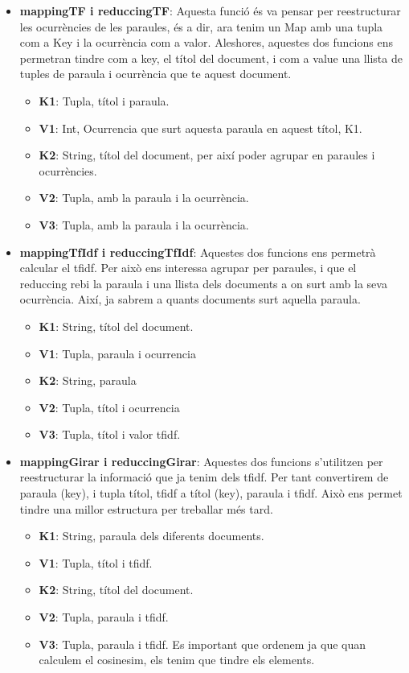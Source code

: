 \documentclass[11pt,a4paper]{article}
\begin{document}
\begin{itemize}
\begin{itemize}
			\item \textbf{mappingTF i reduccingTF}:
Aquesta funció és va pensar per reestructurar les ocurrències de les paraules, és a dir, ara tenim un Map amb una tupla com a Key i la ocurrència com a valor. Aleshores, aquestes dos funcions ens permetran tindre com a key, el títol del document, i com a value  una llista de tuples de paraula i ocurrència que te aquest document.
			\begin{itemize}
				\item \textbf{K1}: Tupla, títol i paraula.
				\item \textbf{V1}: Int, Ocurrencia que surt aquesta paraula en aquest títol, K1.
				\item \textbf{K2}: String, títol del document, per així poder agrupar en paraules i ocurrències.
				\item \textbf{V2}: Tupla, amb la paraula i la ocurrència.
				\item \textbf{V3}: Tupla, amb la paraula i la ocurrència.
			\end{itemize}
			
			\item \textbf{mappingTfIdf i reduccingTfIdf}:
Aquestes dos funcions ens permetrà calcular el tfidf. Per això ens interessa agrupar per paraules, i que el reduccing  rebi la paraula i una llista dels documents a on surt amb la seva ocurrència. Així, ja sabrem a quants documents surt aquella paraula.
			\begin{itemize}
				\item \textbf{K1}: String, títol del document.
				\item \textbf{V1}: Tupla, paraula i ocurrencia
				\item \textbf{K2}: String, paraula
				\item \textbf{V2}: Tupla, títol i ocurrencia
				\item \textbf{V3}: Tupla, títol i valor tfidf.
			\end{itemize}
			
			\item \textbf{mappingGirar i reduccingGirar}:
Aquestes dos funcions s’utilitzen per reestructurar la informació que ja tenim dels tfidf. Per tant convertirem de paraula (key), i tupla títol, tfidf a títol (key), paraula i tfidf. Això ens permet tindre una millor estructura per treballar més tard.
			\begin{itemize}
				\item \textbf{K1}: String, paraula dels diferents documents.
				\item \textbf{V1}: Tupla, títol i tfidf.
				\item \textbf{K2}: String, títol del document.
				\item \textbf{V2}: Tupla, paraula i tfidf.
				\item \textbf{V3}: Tupla, paraula i tfidf. Es important que ordenem ja que quan calculem el cosinesim, els tenim que tindre els elements.
			\end{itemize}
			

\end{itemize}
\end{itemize}
\end{document}

